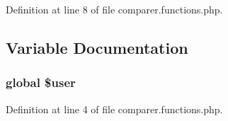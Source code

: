 Definition at line 8 of file comparer.functions.php.



\subsection{Variable Documentation}
\hypertarget{comparer_8functions_8php_a00365e6c5f70c43fb2ed86c9bc5626e0}{
\subsubsection[{\$user}]{\setlength{\rightskip}{0pt plus 5cm}global \$user}}
\label{comparer_8functions_8php_a00365e6c5f70c43fb2ed86c9bc5626e0}


Definition at line 4 of file comparer.functions.php.

